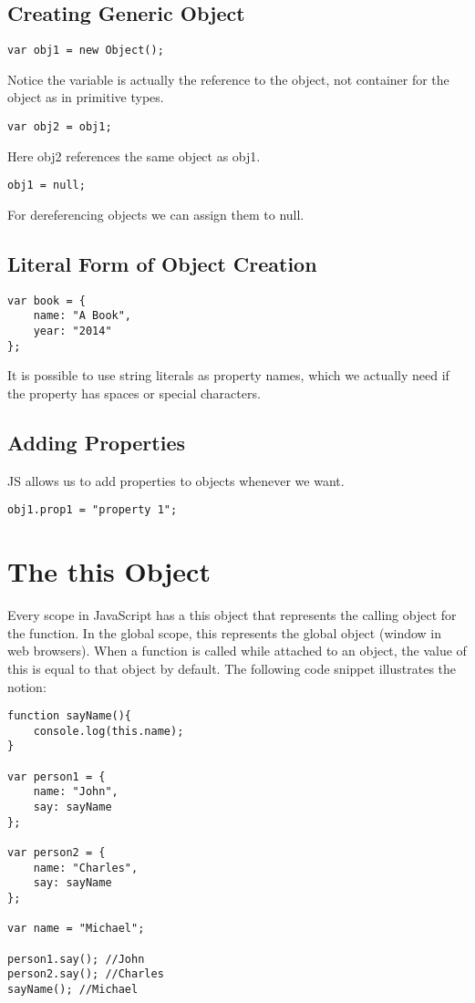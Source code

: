 \documentclass[12pt, a4paper]{article}
\begin{document}
\subsection{Creating Generic Object}
\begin{verbatim}
var obj1 = new Object();
\end{verbatim}
Notice the variable is actually the reference to the object, not container for the object as in primitive types.

\begin{verbatim}
var obj2 = obj1;
\end{verbatim}
Here obj2 references the same object as obj1.

\begin{verbatim}
obj1 = null;
\end{verbatim}
For dereferencing objects we can assign them to null.
\subsection{Literal Form of Object Creation}
\begin{verbatim}
var book = {
    name: "A Book",
    year: "2014"
};
\end{verbatim}
It is possible to use string literals as property names, which we actually need if the property has spaces or special characters.
\subsection{Adding Properties}
JS allows us to add properties to objects whenever we want.
\begin{verbatim}
obj1.prop1 = "property 1";
\end{verbatim}

\section{The this Object}
Every scope in JavaScript has a this object that represents the calling object for the function.
In the global scope, this represents the global object (window in web browsers).
When a function is called while attached to an object, the value of this is equal to that object by default.
The following code snippet illustrates the notion:
\begin{verbatim}
function sayName(){
    console.log(this.name);
}

var person1 = {
    name: "John",
    say: sayName
};

var person2 = {
    name: "Charles",
    say: sayName
};

var name = "Michael";

person1.say(); //John
person2.say(); //Charles
sayName(); //Michael
\end{verbatim}
\end{document}

